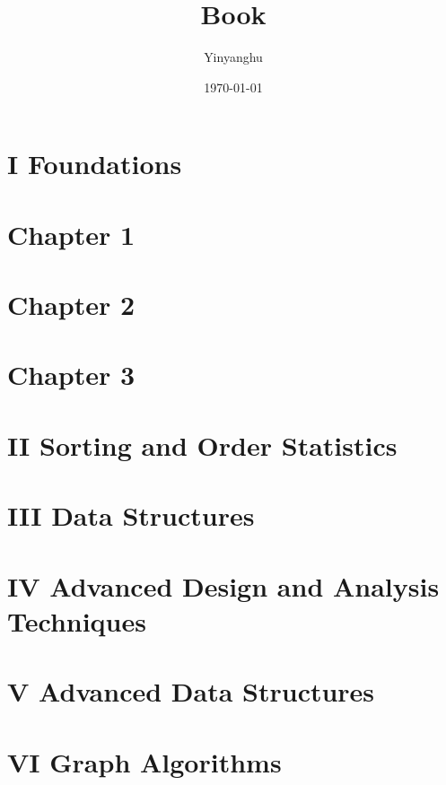 \documentclass[11pt,a4paper]{book}
\title{Book}
\author{Yinyanghu}
\date{\today}
\begin{document}

\frontmatter
\maketitle

\tableofcontents
\listoffigures
\listoftables

\mainmatter


\section*{I Foundations}
\pagebreak

\section*{Chapter 1}

\pagebreak

\section*{Chapter 2}

\pagebreak


\section*{Chapter 3}

\pagebreak

\section*{II Sorting and Order Statistics}
\pagebreak


\section*{III Data Structures}
\pagebreak


\section*{IV Advanced Design and Analysis Techniques}
\pagebreak

\section*{V Advanced Data Structures}
\pagebreak


\section*{VI Graph Algorithms}
\pagebreak
\end{document}
